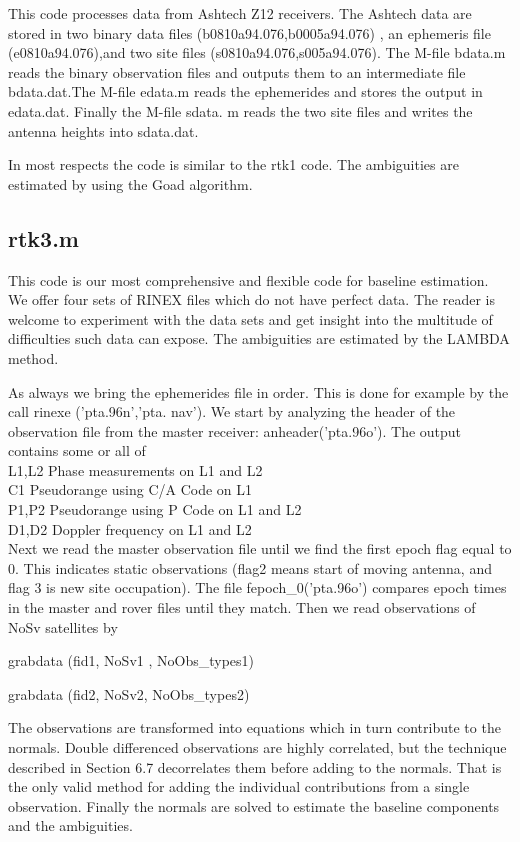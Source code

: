 This code processes data from Ashtech Z12 receivers. The Ashtech data are stored in two
binary data files (b0810a94.076,b0005a94.076) , an ephemeris file (e0810a94.076),and two site files (s0810a94.076,s005a94.076). The M-file bdata.m reads the binary observation files and outputs them to an intermediate file bdata.dat.The M-file edata.m reads the ephemerides and stores the output in edata.dat. Finally the M-file sdata. m reads the two site files and writes the antenna heights into sdata.dat.

In most respects the code is similar to the rtk1 code. The ambiguities are estimated
by using the Goad algorithm.

\subsection{rtk3.m}

This code is our most comprehensive and flexible code for baseline estimation. We offer four sets of RINEX files which do not have perfect data. The reader is welcome to experiment with the data sets and get insight into the multitude of difficulties such data can expose. The ambiguities are estimated by the LAMBDA method.

As always we bring the ephemerides file in order. This is done for example by the call rinexe ('pta.96n','pta. nav'). We start by analyzing the header of the observation file from the master receiver: anheader('pta.96o'). The output contains some or all of\\
L1,L2 Phase measurements on L1 and L2\\
C1 Pseudorange using C/A Code on L1\\
P1,P2 Pseudorange using P Code on L1 and L2\\
D1,D2 Doppler frequency on L1 and L2\\

Next we read the master observation file until we find the first epoch flag equal to 0. This
indicates static observations (flag2 means start of moving antenna, and flag 3 is new site occupation). The file fepoch\_0('pta.96o') compares epoch times in the master and rover files until they match. Then we read observations of NoSv satellites by

grabdata (fid1, NoSv1 , NoObs\_types1)

grabdata (fid2, NoSv2, NoObs\_types2)

The observations are transformed into equations which in turn contribute to the normals. Double differenced observations are highly correlated, but the technique described in Section 6.7 decorrelates them before adding to the normals. That is the only valid method for adding the individual contributions from a single observation. Finally the normals are solved to estimate the baseline components and the ambiguities.

